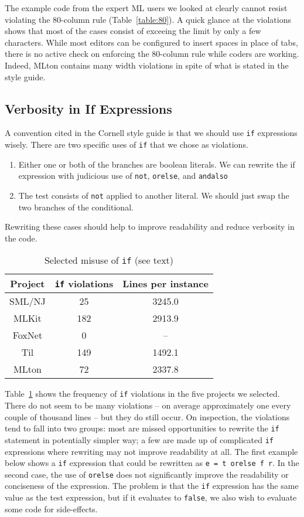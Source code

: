 \documentclass[12pt,abstracton]{scrartcl}
\begin{document}
The example code from the expert ML users we looked at clearly cannot
resist violating the 80-column rule (Table~\ref{table:80}). A quick glance
at the violations shows that most of the cases consist of exceeing the limit
by only a few characters. While most editors can be configured to insert
spaces in place of tabs, there is no active check on enforcing the 80-column
rule while coders are working.
Indeed, MLton contains many width violations in spite of what is stated in the style guide.
\subsection{Verbosity in If Expressions}
A convention cited in the Cornell style guide is that we should use \texttt{if}
expressions wisely. There are two specific uses of \texttt{if} that we
chose as violations.
\begin{enumerate}
\item Either one or both of the branches are boolean literals. We can rewrite the if expression with judicious use of \texttt{not}, \texttt{orelse}, and \texttt{andalso}
\item The test consists of \texttt{not} applied to another literal. We should just swap the two branches of the conditional.
\end{enumerate}
Rewriting these cases should help to improve readability and reduce verbosity in the code.

\begin{table}[h!]
\centering
\begin{tabular}{|c||c|c|}\hline
Project & \texttt{if} violations & Lines per instance \\ \hline\hline
SML/NJ & 25 & 3245.0 \\
MLKit & 182 & 2913.9 \\
FoxNet & 0 & -- \\
Til & 149 & 1492.1 \\
MLton & 72 & 2337.8 \\ \hline
\end{tabular}
\caption{Selected misuse of \texttt{if} (see text)}
\label{table:if}
\end{table}

Table~\ref{table:if} shows the frequency of \texttt{if} violations in the five projects we selected.
There do not seem to be many violations -- on average approximately one every couple of thousand lines --
but they do still occur.
On inspection, the violations tend to fall into two groups: most are
missed opportunities to rewrite the \texttt{if} statement in potentially simpler way; 
a few are made up of complicated \texttt{if} expressions where rewriting may not improve readability at all.
The first example below shows a \texttt{if} expression that could be rewritten as \texttt{e = t orelse f r}.
In the second case, the use of \texttt{orelse} does not significantly improve the readability or conciseness
of the expression. The problem is that the \texttt{if} expression has the same value as the test expression,
but if it evaluates to \texttt{false}, we also wish to evaluate some code for side-effects.
\end{document}
